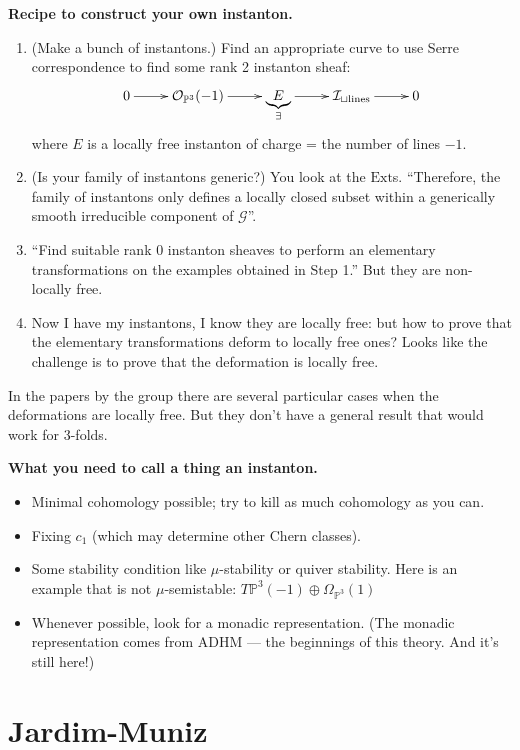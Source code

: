 \medskip\noindent
{\bf Recipe to construct your own instanton.}
\begin{enumerate}
\item (Make a bunch of instantons.) Find an
appropriate curve to
use Serre correspondence to find some
rank 2 instanton sheaf:
$$
\xymatrix{
0\ar[r]&\mathcal{O}_{\mathbb{P}^3}(-1)\ar[r]&
\underbrace{E}_{\exists
}\ar[r]&\mathcal{I}_{\sqcup
\text{lines}}\ar[r]&0
}
$$
where $E$ is a locally free instanton
of charge = the number of lines $-1$.

\item (Is your family of instantons generic?)
You look at the $\text{Ext}$s.
``Therefore, the family of instantons only
defines a locally closed subset
within a generically smooth irreducible
component of $\mathcal{G}$''.

\item ``Find suitable rank 0 instanton
sheaves
 to perform an elementary
transformations on the examples obtained in
Step 1.'' But they are non-locally
free.

\item Now I have my instantons, I know they
are locally free: but how to prove
that the elementary transformations deform
to locally free ones? Looks like
the challenge is to prove that the
deformation is locally free.
\end{enumerate}

In the papers by the group there are several
particular cases when the
deformations are locally free. But they don't
have a general result that would
work for 3-folds.

\medskip\noindent
{\bf What you need to call a thing an
instanton.}
\begin{itemize}
\item Minimal cohomology possible;
try to kill as much cohomology as you can.
\item Fixing $c_1$ (which may determine other
Chern classes).
\item Some stability condition
like $\mu$-stability or quiver stability.
Here is an example that is not
$\mu$-semistable:
$T\mathbb{P}^3(-1)\oplus\Omega_{\mathbb{P}^3}
(1)$
\item Whenever possible,
look for a monadic representation.
(The monadic
representation comes from ADHM ---
the beginnings of this theory.
And it's still here!)
\end{itemize}

\section{Jardim-Muniz}
\label{section-jardim-muniz}

